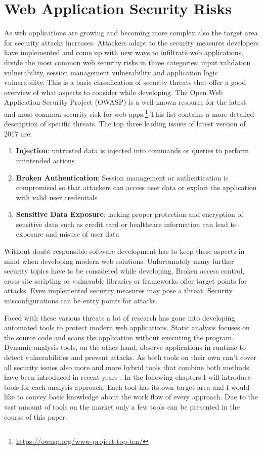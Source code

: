\section{Web Application Security Risks}
As web applications are growing and becoming more complex also the target area for security attacks increases. Attackers adapt to the security measures developers have implemented and come up with new ways to infiltrate web applications.\newline
\textcite[5]{Li2014} divide the most common web security risks in three categories: input validation vulnerability, session management vulnerability and application logic vulnerability. This is a basic classification of security threats that offer a good overview of what aspects to consider while developing. The Open Web Application Security Project (OWASP) is a well-known resource for the latest and most common security risk for web apps.\footnote{ \url{https://owasp.org/www-project-top-ten/}} This list contains a more detailed description of specific threats. The top three leading issues of latest version of 2017 are: 

\begin{enumerate}
    \item \textbf{Injection}: untrusted data is injected into commands or queries to perform unintended actions
    \item \textbf{Broken Authentication}: Session management or authentication is compromised so that attackers can access user data or exploit the application with valid user credentials    
    \item \textbf{Sensitive Data Exposure}: lacking proper protection and encryption of sensitive data such as credit card or healthcare information can lead to exposure and misuse of user data
\end{enumerate}

Without doubt responsible software development has to keep these aspects in mind when developing modern web solutions. Unfortunately many further security topics have to be considered while developing. Broken access control, cross-site scripting or vulnerable libraries or frameworks offer target points for attacks. Even implemented security measures may pose a threat. Security misconfigurations can be entry points for attacks.\newline

Faced with these various threats a lot of research has gone into developing automated tools to protect modern web applications. Static analysis focuses on the source code and scans the application without executing the program. Dynamic analysis tools, on the other hand, observe applications in runtime to detect vulnerabilities and prevent attacks. As both tools on their own can't cover all security issues also more and more hybrid tools that combine both methods have been introduced in recent years \autocite[]{Jahanshahi2018, Lam2008, Hosek2011}.\newline 
In the following chapters I will introduce tools for each analysis approach. Each tool has its own target area and I would like to convey basic knowledge about the work flow of every approach. Due to the vast amount of tools on the market only a few tools can be presented in the course of this paper.


